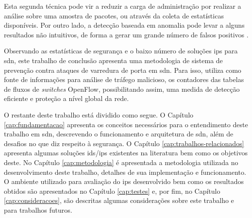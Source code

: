 Esta segunda técnica pode vir a reduzir a carga de administração por realizar a análise sobre uma amostra de pacotes, ou através da coleta de estatísticas disponíveis. Por outro lado, a detecção baseada em anomalia pode levar a alguns resultados não intuitivos, de forma a gerar um grande número de falsos positivos \cite{heberlein:2007}.

Observando as estatísticas de segurança e o baixo número de soluções \gls{ips} para \gls{sdn}, este trabalho de conclusão apresenta uma metodologia de sistema de prevenção contra ataques de varredura de porta em \gls{sdn}. Para isso, utiliza como fonte de informações para análise de tráfego malicioso, os contadores das tabelas de fluxos de \textit{switches} OpenFlow, possibilitando assim, uma medida de detecção eficiente e proteção a nível global da rede.

O restante deste trabalho está dividido como segue. O Capítulo \ref{cap:fundamentacao} apresenta os conceitos necessários para o entendimento deste trabalho em \gls{sdn}, descrevendo o funcionamento e arquitetura de \gls{sdn}, além de desafios no que diz respeito à segurança. O Capítulo \ref{cap:trabalhos-relacionados} apresenta algumas soluções \gls{ids}/\gls{ips} existentes na literatura bem como os objetivos deste. No Capítulo \ref{cap:metodologia} é apresentada a metodologia utilizada no desenvolvimento deste trabalho, detalhes de sua implementação e funcionamento. O ambiente utilizado para avaliação do \gls{ips} desenvolvido bem como os resultados obtidos são apresentados no Capítulo \ref{cap:testes} e, por fim, no Capítulo \ref{cap:consideracoes}, são descritas algumas considerações sobre este trabalho e para trabalhos futuros.